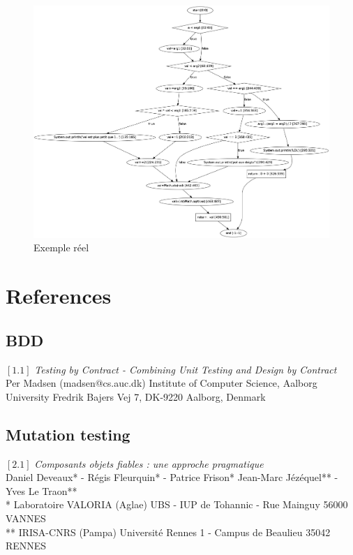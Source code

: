 \documentclass[a4paper]{report}
\begin{document}
\begin{figure}[h!]
   \caption{\label{étiquette} Exemple réel}
   \includegraphics[scale=0.3]{../graphviz/realExemple.png}
\end{figure}

\chapter*{References}
\section*{BDD}
$[1.1]$ \textit{Testing by Contract
- Combining Unit Testing and Design by Contract}\\
Per Madsen (madsen@cs.auc.dk)
Institute of Computer Science, Aalborg University
Fredrik Bajers Vej 7, DK-9220 Aalborg, Denmark\\
\newline



\section*{Mutation testing}
$[2.1]$ \textit{Composants objets fiables :
une approche pragmatique}\\
Daniel Deveaux* - Régis Fleurquin* - Patrice Frison*
Jean-Marc Jézéquel** - Yves Le Traon**\\
* Laboratoire VALORIA (Aglae)
UBS - IUP de Tohannic - Rue Mainguy
56000 VANNES\\
** IRISA-CNRS (Pampa)
Université Rennes 1 - Campus de Beaulieu
35042 RENNES\\
\newline
\end{document}

